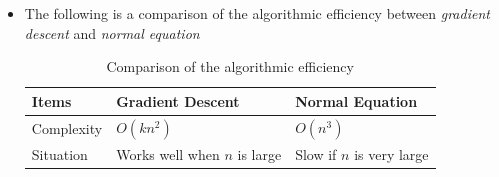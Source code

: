 \begin{itemize}
    \item The following is a comparison of the algorithmic efficiency between \emph{gradient descent} and \emph{normal equation}
    \begin{table}[H]
        \renewcommand\arraystretch{1.5}
        \caption{Comparison of the algorithmic efficiency}
        \centering
        \begin{tabular}[t]{lll}     
            \hline 
            Items      & Gradient Descent             & Normal Equation          \\ 
            \hline 
            Complexity & $O\left(kn^2\right)$         & $O\left(n^3\right)$      \\ 
            Situation  & Works well when $n$ is large & Slow if $n$ is very large\\
            \hline
        \end{tabular}
    \end{table}
\end{itemize} 
